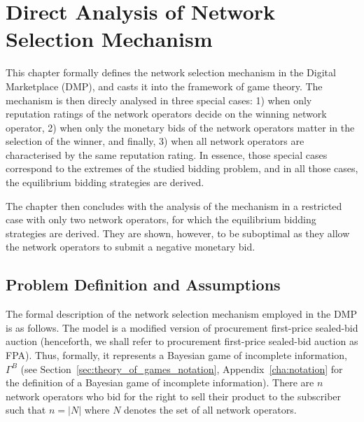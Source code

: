 \chapter{Direct Analysis of Network Selection Mechanism} %
\label{cha:direct}

\minitoc
\vspace{10mm}

This chapter formally defines the network selection mechanism in the Digital Marketplace (DMP), and casts it into the framework of game theory. The mechanism is then direcly analysed in three special cases: 1) when only reputation ratings of the network operators decide on the winning network operator, 2) when only the monetary bids of the network operators matter in the selection of the winner, and finally, 3) when all network operators are characterised by the same reputation rating. In essence, those special cases correspond to the extremes of the studied bidding problem, and in all those cases, the equilibrium bidding strategies are derived.

The chapter then concludes with the analysis of the mechanism in a restricted case with only two network operators, for which the equilibrium bidding strategies are derived. They are shown, however, to be suboptimal as they allow the network operators to submit a negative monetary bid.

\section{Problem Definition and Assumptions} %
\label{sec:problem_definition_and_assumptions_direct}
The formal description of the network selection mechanism employed in the DMP is as follows. The model is a modified version of procurement first-price sealed-bid auction (henceforth, we shall refer to procurement first-price sealed-bid auction as FPA). Thus, formally, it represents a Bayesian game of incomplete information, $\Gamma^B$ (see Section~\ref{sec:theory_of_games_notation}, Appendix~\ref{cha:notation} for the definition of a Bayesian game of incomplete information). There are $n$ network operators who bid for the right to sell their product to the subscriber such that $n = |N|$ where $N$ denotes the set of all network operators.


